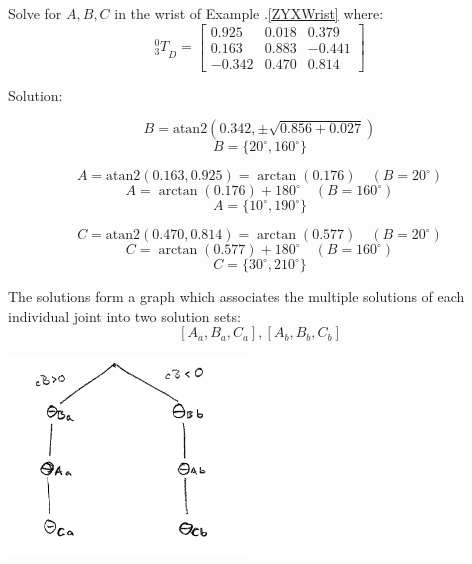 \begin{Example}
Solve for $A,B,C$ in the wrist of Example \thechapter.\ref{ZYXWrist} where:
\[
{^0_3T}_D =
\begin{bmatrix}
0.925	&	0.018	&	0.379	\\
0.163	&	0.883	&	-0.441	\\
-0.342	&	0.470	&	0.814
\end{bmatrix}
\]

Solution:

\[
B = \mathrm{atan2} \left ( 0.342, \pm\sqrt{0.856+0.027} \right )
\]
\[
B = \{20^{\circ}, 160^{\circ}\}
\]

\[
A = \mathrm{atan2}(0.163, 0.925) = \arctan(0.176)  \quad (B = 20^{\circ})
\]
\[
A = \arctan(0.176)  + 180^{\circ}  \quad (B = 160^{\circ})
\]
\[
A = \{ 10^{\circ}, 190^{\circ} \}
\]


\[
C = \mathrm{atan2}(0.470, 0.814) = \arctan(0.577)  \quad (B = 20^{\circ})
\]
\[
C = \arctan(0.577)  + 180^{\circ}  \quad (B = 160^{\circ})
\]
\[
C = \{ 30^{\circ}, 210^{\circ} \}
\]

The solutions form a graph   which associates the multiple solutions of each
individual joint into two solution sets:
\[
[A_a, B_a, C_a], [A_b, B_b, C_b]
\]
\begin{center}
\includegraphics[width=2.5in]{figs04/sol_graph_wrist.png}
\end{center}

\end{Example}

